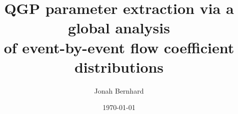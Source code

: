 \documentclass[reprint,amsmath]{revtex4-1}
\begin{document}
\title{QGP parameter extraction via a global analysis \\ of event-by-event flow coefficient distributions}
\author{Jonah Bernhard}
\date{\today}

\maketitle


%
%
%



\end{document}
